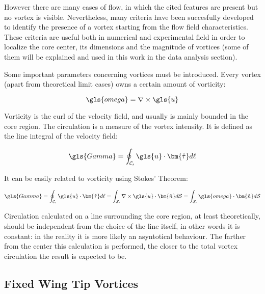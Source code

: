However there are many cases of flow, in which the cited features are present but no vortex is visible. Nevertheless, many criteria have been succesfully developed to identify the presence of a vortex starting from the flow field characteristics. These criteria are useful both in numerical and experimental field in order to localize the core center, its dimensions and the magnitude of vortices (some of them will be explained and used in this work in the data analysis section). 

Some important parameters concerning vortices must be introduced. Every vortex (apart from theoretical limit cases) owns a certain amount of vorticity:

\begin{equation}
	\gls{omega} = \nabla \times \gls{u}
\end{equation}

Vorticity is the curl of the velocity field, and usually is mainly bounded in the core region. The circulation is a measure of the vortex intensity. It is defined as the line integral of the velocity field:

\begin{equation}
	\gls{Gamma} = \oint_{\mathcal{C_0}} \gls{u} \cdot \bm{\hat{\tau}} d\ell
\end{equation}

It can be easily related to vorticity using Stokes' Theorem:

\begin{equation}
	\gls{Gamma} = \oint_{\mathcal{C_0}} \gls{u} \cdot \bm{\hat{\tau}} d\ell = \int_{\mathcal{S_0}} \nabla \times \gls{u} \cdot \bm{\hat{n}} d\mathcal{S} = \int_{\mathcal{S_0}} \gls{omega} \cdot \bm{\hat{n}} d\mathcal{S}
\end{equation}

Circulation calculated on a line surrounding the core region, at least theoretically, should be independent from the choice of the line itself, in other words it is constant: in the reality it is more likely an asyntotical behaviour. The farther from the center this calculation is performed, the closer to the total vortex circulation the result is expected to be.



\subsection{Fixed Wing Tip Vortices}


